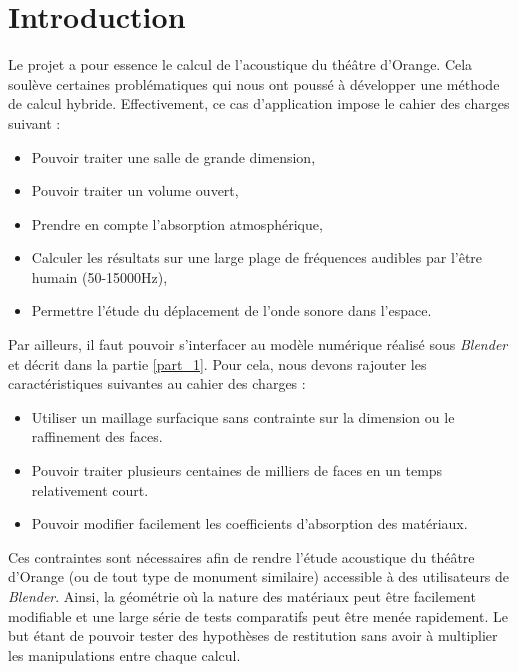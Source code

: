 \section*{Introduction} \label{sect_methodecouplee}
Le projet a pour essence le calcul de l'acoustique du théâtre d'Orange. Cela soulève certaines problématiques qui nous ont poussé à développer une méthode de calcul hybride. Effectivement, ce cas d'application impose le cahier des charges suivant :
\begin{itemize}
	\item Pouvoir traiter une salle de grande dimension,
	\item Pouvoir traiter un volume ouvert,
	\item Prendre en compte l'absorption atmosphérique,
	\item Calculer les résultats sur une large plage de fréquences audibles par l'être humain (50-15000Hz),
	\item Permettre l'étude du déplacement de l'onde sonore dans l'espace.
\end{itemize}
Par ailleurs, il faut pouvoir s'interfacer au modèle numérique réalisé sous \textit{Blender} et décrit dans la partie \ref{part_1}. Pour cela, nous devons rajouter les caractéristiques suivantes au cahier des charges :

\begin{itemize}
	\item Utiliser un maillage surfacique sans contrainte sur la dimension ou le raffinement des faces.
	\item Pouvoir traiter plusieurs centaines de milliers de faces en un temps relativement court.
	\item Pouvoir modifier facilement les coefficients d'absorption des matériaux.
\end{itemize}

Ces contraintes sont nécessaires afin de rendre l'étude acoustique du théâtre d'Orange (ou de tout type de monument similaire) accessible à des utilisateurs de \textit{Blender}. Ainsi, la géométrie où la nature des matériaux peut être facilement modifiable et une large série de tests comparatifs peut être menée rapidement. Le but étant de pouvoir tester des hypothèses de restitution sans avoir à multiplier les manipulations entre chaque calcul.


